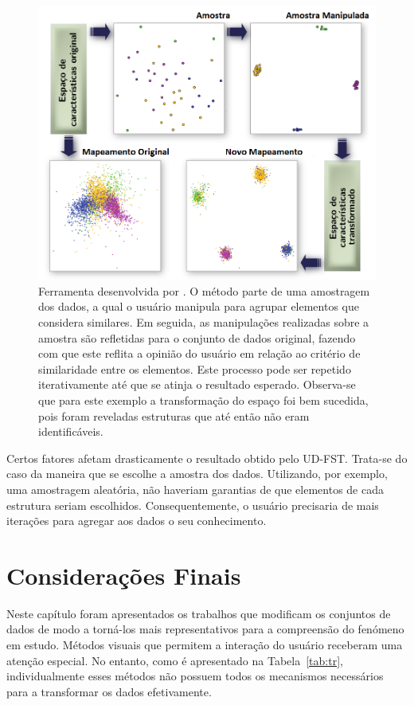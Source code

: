 \begin{figure}[h!]
    \centering
    \includegraphics[width=16cm]{images/ud.png}
    \caption[Ferramenta desenvolvida por \cite{Gladys2013}]
    {Ferramenta desenvolvida por \cite{Gladys2013}. O método
    parte de uma amostragem dos dados, a qual o usuário
    manipula para agrupar elementos que considera
    similares. Em seguida, as manipulações realizadas
    sobre a amostra são refletidas para o conjunto de
    dados original, fazendo com que este reflita a
    opinião do usuário em relação ao critério de
    similaridade entre os elementos. Este processo pode
    ser repetido iterativamente até que se atinja o
    resultado esperado. Observa-se que para este
    exemplo a transformação do espaço foi bem sucedida, pois
    foram reveladas estruturas que até então não eram
    identificáveis.}
    \label{fig:ud}
\end{figure}

Certos fatores afetam drasticamente o resultado obtido
pelo UD-FST. Trata-se do caso da maneira que se
escolhe a amostra dos dados. Utilizando, por exemplo, uma
amostragem aleatória, não haveriam garantias de que
elementos de cada estrutura seriam escolhidos.
Consequentemente, o usuário precisaria de mais iterações
para agregar aos dados o seu conhecimento.

\section{Considerações Finais}

Neste capítulo foram apresentados os trabalhos que modificam
os conjuntos de dados de modo a torná-los mais
representativos para a compreensão do fenómeno em estudo.
Métodos visuais que permitem a interação do usuário
receberam uma atenção especial. No entanto, como é
apresentado na Tabela~\ref{tab:tr}, individualmente esses
métodos não possuem todos os mecanismos necessários para a
transformar os dados efetivamente.

